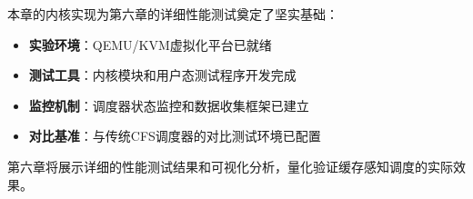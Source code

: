 \begin{tcolorbox}[
    colback=green!5!white,
    colframe=green!50!black,
    title=\textbf{面向第六章的测试准备},
    fonttitle=\bfseries,
    arc=3pt
]
本章的内核实现为第六章的详细性能测试奠定了坚实基础：
\begin{itemize}
    \item \textbf{实验环境}：QEMU/KVM虚拟化平台已就绪
    \item \textbf{测试工具}：内核模块和用户态测试程序开发完成
    \item \textbf{监控机制}：调度器状态监控和数据收集框架已建立
    \item \textbf{对比基准}：与传统CFS调度器的对比测试环境已配置
\end{itemize}
第六章将展示详细的性能测试结果和可视化分析，量化验证缓存感知调度的实际效果。
\end{tcolorbox}
